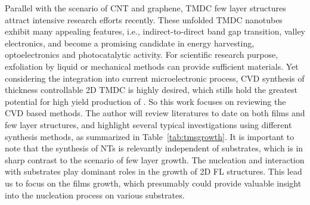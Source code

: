 Parallel with the scenario of CNT and graphene, TMDC few layer structures attract intensive research efforts recently. These unfolded TMDC nanotubes exhibit many appealing features, i.e., indirect-to-direct band gap transition,\cite{Splendiani2010} valley electronics, and become a promising candidate in energy harvesting, optoelectronics and photocatalytic activity. For scientific research purpose, exfoliation by liquid \cite{Smith2011} or mechanical methods \cite{Lee2010a} can provide sufficient materials. Yet considering the integration into current microelectronic process, CVD synthesis of thickness controllable 2D TMDC is highly desired, which stills hold the greatest potential for high yield production of . So this work focuses on reviewing the CVD based methods. The author will review literatures to date on both  films and few layer structures, and highlight several typical investigations using different synthesis methods, as summarized in Table~\ref{tab:tmsgrowth}. It is important to note that the synthesis of NTs is relevantly independent of substrates, which is in sharp contrast to the scenario of few layer growth. The  nucleation and interaction with substrates play dominant roles in the growth of 2D FL structures. This lead us to focus on the  films growth, which presumably could provide valuable insight into the nucleation process on various substrates.

